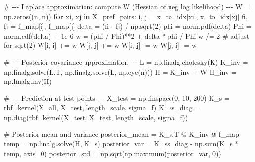 \documentclass[
  letterpaper,
  numbers=noenddot,
  DIV=11]{scrreprt}
\newenvironment{Shaded}{\begin{snugshade}}{\end{snugshade}}
\newcommand{\BuiltInTok}[1]{\textcolor[rgb]{0.00,0.23,0.31}{#1}}
\newcommand{\CommentTok}[1]{\textcolor[rgb]{0.37,0.37,0.37}{#1}}
\newcommand{\ControlFlowTok}[1]{\textcolor[rgb]{0.00,0.23,0.31}{\textbf{#1}}}
\newcommand{\DecValTok}[1]{\textcolor[rgb]{0.68,0.00,0.00}{#1}}
\newcommand{\FloatTok}[1]{\textcolor[rgb]{0.68,0.00,0.00}{#1}}
\newcommand{\KeywordTok}[1]{\textcolor[rgb]{0.00,0.23,0.31}{\textbf{#1}}}
\newcommand{\NormalTok}[1]{\textcolor[rgb]{0.00,0.23,0.31}{#1}}
\newcommand{\OperatorTok}[1]{\textcolor[rgb]{0.37,0.37,0.37}{#1}}
\theoremstyle{plain}
\theoremstyle{definition}
\theoremstyle{remark}
\begin{document}
\begin{Shaded}
\begin{Highlighting}[numbers=left,,]
\CommentTok{\# {-}{-}{-} Laplace approximation: compute W (Hessian of neg log likelihood) {-}{-}{-}}
\NormalTok{W }\OperatorTok{=}\NormalTok{ np.zeros((n, n))}
\ControlFlowTok{for}\NormalTok{ xi, xj }\KeywordTok{in}\NormalTok{ X\_pref\_pairs:}
\NormalTok{    i, j }\OperatorTok{=}\NormalTok{ x\_to\_idx[xi], x\_to\_idx[xj]}
\NormalTok{    fi, fj }\OperatorTok{=}\NormalTok{ f\_map[i], f\_map[j]}
\NormalTok{    delta }\OperatorTok{=}\NormalTok{ (fi }\OperatorTok{{-}}\NormalTok{ fj) }\OperatorTok{/}\NormalTok{ np.sqrt(}\DecValTok{2}\NormalTok{)}
\NormalTok{    phi }\OperatorTok{=}\NormalTok{ norm.pdf(delta)}
\NormalTok{    Phi }\OperatorTok{=}\NormalTok{ norm.cdf(delta) }\OperatorTok{+} \FloatTok{1e{-}6}
\NormalTok{    w }\OperatorTok{=}\NormalTok{ (phi }\OperatorTok{/}\NormalTok{ Phi)}\OperatorTok{**}\DecValTok{2} \OperatorTok{+}\NormalTok{ delta }\OperatorTok{*}\NormalTok{ phi }\OperatorTok{/}\NormalTok{ Phi}
\NormalTok{    w }\OperatorTok{/=} \DecValTok{2}  \CommentTok{\# adjust for sqrt(2)}
\NormalTok{    W[i, i] }\OperatorTok{+=}\NormalTok{ w}
\NormalTok{    W[j, j] }\OperatorTok{+=}\NormalTok{ w}
\NormalTok{    W[i, j] }\OperatorTok{{-}=}\NormalTok{ w}
\NormalTok{    W[j, i] }\OperatorTok{{-}=}\NormalTok{ w}

\CommentTok{\# {-}{-}{-} Posterior covariance approximation {-}{-}{-}}
\NormalTok{L }\OperatorTok{=}\NormalTok{ np.linalg.cholesky(K)}
\NormalTok{K\_inv }\OperatorTok{=}\NormalTok{ np.linalg.solve(L.T, np.linalg.solve(L, np.eye(n)))}
\NormalTok{H }\OperatorTok{=}\NormalTok{ K\_inv }\OperatorTok{+}\NormalTok{ W}
\NormalTok{H\_inv }\OperatorTok{=}\NormalTok{ np.linalg.inv(H)}

\CommentTok{\# {-}{-}{-} Prediction at test points {-}{-}{-}}
\NormalTok{X\_test }\OperatorTok{=}\NormalTok{ np.linspace(}\DecValTok{0}\NormalTok{, }\DecValTok{10}\NormalTok{, }\DecValTok{200}\NormalTok{)}
\NormalTok{K\_s }\OperatorTok{=}\NormalTok{ rbf\_kernel(X\_all, X\_test, length\_scale, sigma\_f)}
\NormalTok{K\_ss\_diag }\OperatorTok{=}\NormalTok{ np.diag(rbf\_kernel(X\_test, X\_test, length\_scale, sigma\_f))}

\CommentTok{\# Posterior mean and variance}
\NormalTok{posterior\_mean }\OperatorTok{=}\NormalTok{ K\_s.T }\OperatorTok{@}\NormalTok{ K\_inv }\OperatorTok{@}\NormalTok{ f\_map}
\NormalTok{temp }\OperatorTok{=}\NormalTok{ np.linalg.solve(H, K\_s)}
\NormalTok{posterior\_var }\OperatorTok{=}\NormalTok{ K\_ss\_diag }\OperatorTok{{-}}\NormalTok{ np.}\BuiltInTok{sum}\NormalTok{(K\_s }\OperatorTok{*}\NormalTok{ temp, axis}\OperatorTok{=}\DecValTok{0}\NormalTok{)}
\NormalTok{posterior\_std }\OperatorTok{=}\NormalTok{ np.sqrt(np.maximum(posterior\_var, }\DecValTok{0}\NormalTok{))}


\end{Highlighting}
\end{Shaded}
\end{document}
